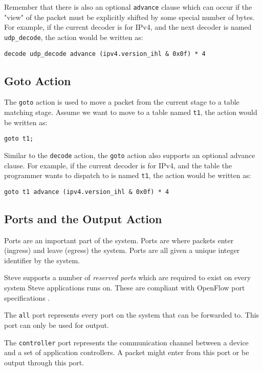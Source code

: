 Remember that there is also an optional \texttt{advance} clause which can occur if the "view" of the packet must be explicitly shifted by some special number of bytes. For example, if the current decoder is for IPv4, and the next decoder is named \texttt{udp\_decode}, the action would be written as:

\begin{lstlisting}
decode udp_decode advance (ipv4.version_ihl & 0x0f) * 4
\end{lstlisting}

\subsection{Goto Action} \label{tut:goto_action}

The \texttt{goto} action is used to move a packet from the current stage to a table matching stage. Assume we want to move to a table named \texttt{t1}, the action would be written as:

\begin{lstlisting}
goto t1;
\end{lstlisting}

Similar to the \texttt{decode} action, the \texttt{goto} action also supports an optional advance clause. For example, if the current decoder is for IPv4, and the table the programmer wants to dispatch to is named \texttt{t1}, the action would be written as:

\begin{lstlisting}
goto t1 advance (ipv4.version_ihl & 0x0f) * 4
\end{lstlisting}

\subsection{Ports and the Output Action} \label{tut:output_action}

Ports are an important part of the system. Ports are where packets enter (ingress) and leave (egress) the system. Ports are all given a unique integer identifier by the system.

Steve supports a number of \textit{reserved ports} which are required to exist on every system Steve applications runs on. These are compliant with OpenFlow port specifications \cite{openflow_spec}.

The \texttt{all} port represents every port on the system that can be forwarded to. This port can only be used for output.

The \texttt{controller} port represents the communication channel between a device and a set of application controllers. A packet might enter from this port or be output through this port.

